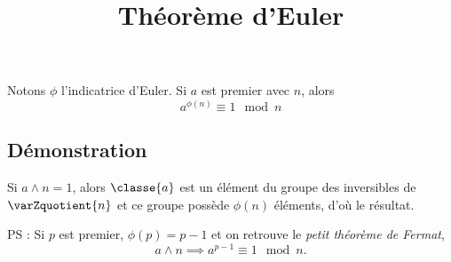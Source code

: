 \documentclass[fontsize=12pt,twoside=false,parskip=half, french]{scrartcl}
\title{Théorème d’Euler}
\date{}
\author{}
\begin{document}
\maketitle
   \begin{Theoreme}
      Notons $\phi$ l’indicatrice d’Euler. Si $a$ est premier avec $n$, alors
      \[
         a^{\phi(n)} \equiv 1 \mod n
      \]
   \end{Theoreme}
   \subsection{Démonstration}
      Si $a \wedge n = 1$, alors $\classe{a}$ est un élément du groupe des inversibles de  $\varZquotient{n}$ et ce groupe possède $\phi(n)$ éléments, d’où le résultat.

      PS : Si $p$ est premier, $\phi(p) = p - 1$ et on retrouve le \emph{petit théorème de Fermat},
      \[
         a \wedge n \implies a^{p - 1} \equiv 1 \mod n.
      \]
\end{document}
